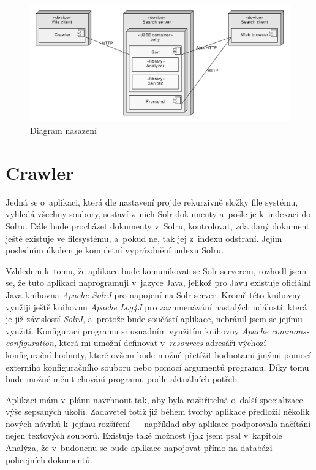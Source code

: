 \begin{figure}[h]
\begin{center}
\includegraphics[width=13cm]{Architecture}
\caption{Diagram nasazení}
\label{fig:Architecture}
\end{center}
\end{figure}

\section{Crawler} \label{design_crawler}
Jedná se o~aplikaci, která dle nastavení projde rekurzivně složky file systému, vyhledá všechny soubory, sestaví z~nich Solr dokumenty a~pošle je k~indexaci do Solru. Dále bude procházet dokumenty v~Solru, kontrolovat, zda daný dokument ještě existuje ve filesystému, a~pokud ne, tak jej z~indexu odstraní. Jejím posledním úkolem je kompletní vyprázdnění indexu Solru.

Vzhledem k~tomu, že aplikace bude komunikovat se Solr serverem, rozhodl jsem se, že tuto aplikaci naprogramuji v~jazyce Java, jelikož pro Javu existuje oficiální Java knihovna \emph{Apache SolrJ} pro napojení na Solr server. Kromě této knihovny využiji ještě knihovnu \emph{Apache Log4J} pro zaznmenávání nastalých událostí, která je již závislostí \emph{SolrJ}, a~protože bude součástí aplikace, nebránil jsem se jejímu využití. Konfiguraci programu si usnadním využitím knihovny \emph{Apache commons-configuration}, která mi umožní definovat v~\emph{resources} adresáři výchozí konfigurační hodnoty, které ovšem bude možné přetížit hodnotami jinými pomocí externího konfiguračního souboru nebo pomocí argumentů programu. Díky tomu bude možné měnit chování programu podle aktuálních potřeb.

Aplikaci mám v~plánu navrhnout tak, aby byla rozšiřitelná o~další specializace výše sepsaných úkolů. Zadavetel totiž již během tvorby aplikace předložil několik nových návrhů k~jejímu rozšíření — například aby aplikace podporovala načítání nejen textových souborů. Existuje také možnost (jak jsem psal v~kapitole Analýza, že v~budoucnu se bude aplikace napojovat přímo na databázi policejních dokumentů.

